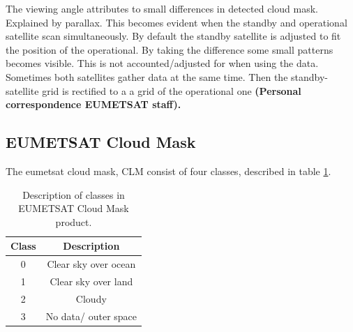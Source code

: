 The viewing angle attributes to small differences in detected cloud mask. Explained by parallax. This becomes evident when the standby and operational satellite scan simultaneously. By default the standby satellite is adjusted to fit the position of the operational. By taking the difference some small patterns becomes visible. This is not accounted/adjusted for when using the data. Sometimes both satellites gather data at the same time. Then the standby-satellite grid is rectified to a a grid of the operational one \textbf{(Personal correspondence EUMETSAT staff).} 

\subsection{EUMETSAT Cloud Mask} \label{sec:EUMETSAT_cloud_mask}

The \acrshort{eumetsat} cloud mask, CLM consist of four classes, described in table \ref{tab:classes_clm}.

\begin{table}[]
    \centering
    \begin{tabular}{c|c}
        Class & Description \\ \hline
        0 & Clear sky over ocean \\
        1 & Clear sky over land \\
        2 & Cloudy \\
        3 & No data/ outer space        
    \end{tabular}
    \caption{Description of classes in EUMETSAT Cloud Mask product.}
    \label{tab:classes_clm}
\end{table}


